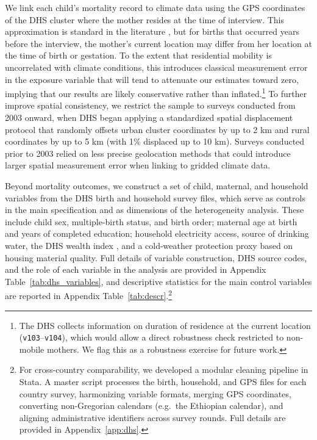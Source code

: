 \documentclass[a4paper]{article}
\begin{document}
We link each child's mortality record to climate data using the GPS coordinates of the DHS cluster where the mother resides at the time of interview. This approximation is standard in the literature \parencite{wang2025,dimitrova2024}, but for births that occurred years before the interview, the mother's current location may differ from her location at the time of birth or gestation. To the extent that residential mobility is uncorrelated with climate conditions, this introduces classical measurement error in the exposure variable that will tend to attenuate our estimates toward zero, implying that our results are likely conservative rather than inflated.\footnote{The DHS collects information on duration of residence at the current location (\texttt{v103}--\texttt{v104}), which would allow a direct robustness check restricted to non-mobile mothers. We flag this as a robustness exercise for future work.} To further improve spatial consistency, we restrict the sample to surveys conducted from 2003 onward, when DHS began applying a standardized spatial displacement protocol that randomly offsets urban cluster coordinates by up to 2 km and rural coordinates by up to 5 km (with 1\% displaced up to 10 km). Surveys conducted prior to 2003 relied on less precise geolocation methods that could introduce larger spatial measurement error when linking to gridded climate data.

Beyond mortality outcomes, we construct a set of child, maternal, and household variables from the DHS birth and household survey files, which serve as controls in the main specification and as dimensions of the heterogeneity analysis. These include child sex, multiple-birth status, and birth order; maternal age at birth and years of completed education; household electricity access, source of drinking water, the DHS wealth index \parencite{filmer2001}, and a cold-weather protection proxy based on housing material quality. Full details of variable construction, DHS source codes, and the role of each variable in the analysis are provided in Appendix Table~\ref{tab:dhs_variables}, and descriptive statistics for the main control variables are reported in Appendix Table~\ref{tab:descr}.\footnote{For cross-country comparability, we developed a modular cleaning pipeline in Stata. A master script processes the birth, household, and GPS files for each country survey, harmonizing variable formats, merging GPS coordinates, converting non-Gregorian calendars (e.g.\ the Ethiopian calendar), and aligning administrative identifiers across survey rounds. Full details are provided in Appendix~\ref{app:dhs}.}
\end{document}
